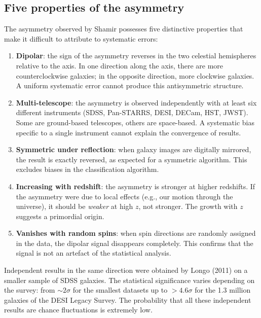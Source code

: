 \documentclass[10pt,a4paper]{article}
\begin{document}
\subsection{Five properties of the asymmetry}

The asymmetry observed by Shamir possesses five distinctive properties that make it difficult to attribute to systematic errors:

\begin{enumerate}
\item \textbf{Dipolar}: the sign of the asymmetry reverses in the two celestial hemispheres relative to the axis. In one direction along the axis, there are more counterclockwise galaxies; in the opposite direction, more clockwise galaxies. A uniform systematic error cannot produce this antisymmetric structure.

\item \textbf{Multi-telescope}: the asymmetry is observed independently with at least six different instruments (SDSS, Pan-STARRS, DESI, DECam, HST, JWST). Some are ground-based telescopes, others are space-based. A systematic bias specific to a single instrument cannot explain the convergence of results.

\item \textbf{Symmetric under reflection}: when galaxy images are digitally mirrored, the result is exactly reversed, as expected for a symmetric algorithm. This excludes biases in the classification algorithm.

\item \textbf{Increasing with redshift}: the asymmetry is stronger at higher redshifts. If the asymmetry were due to local effects (e.g., our motion through the universe), it should be \textit{weaker} at high $z$, not stronger. The growth with $z$ suggests a primordial origin.

\item \textbf{Vanishes with random spins}: when spin directions are randomly assigned in the data, the dipolar signal disappears completely. This confirms that the signal is not an artefact of the statistical analysis.
\end{enumerate}

Independent results in the same direction were obtained by Longo (2011) \cite{Longo2011} on a smaller sample of SDSS galaxies. The statistical significance varies depending on the survey: from $\sim 2\sigma$ for the smallest datasets up to $>4.6\sigma$ for the 1.3 million galaxies of the DESI Legacy Survey. The probability that all these independent results are chance fluctuations is extremely low.
\end{document}
